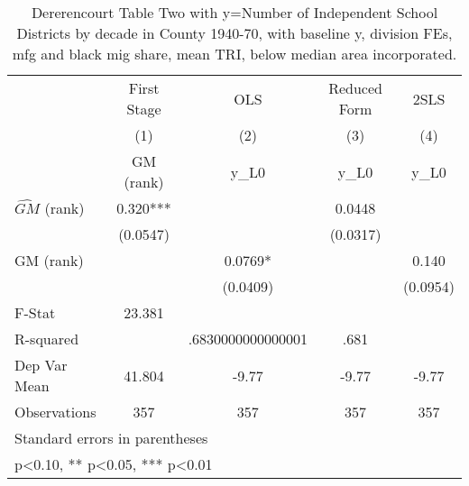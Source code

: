 \begin{table}[htbp]\centering
\def\sym#1{\ifmmode^{#1}\else\(^{#1}\)\fi}
\caption{Dererencourt Table Two with y=Number of Independent School Districts by decade in County 1940-70, with baseline y, division FEs, mfg and black mig share, mean TRI, below median area incorporated.}
\begin{tabular}{l*{4}{c}}
\toprule
                    & First Stage   &         OLS   &Reduced Form   &        2SLS   \\
                    &\multicolumn{1}{c}{(1)}&\multicolumn{1}{c}{(2)}&\multicolumn{1}{c}{(3)}&\multicolumn{1}{c}{(4)}\\
                    &\multicolumn{1}{c}{GM  (rank)}&\multicolumn{1}{c}{y\_L0}&\multicolumn{1}{c}{y\_L0}&\multicolumn{1}{c}{y\_L0}\\
\midrule
$\hat{GM}$ (rank)   &       0.320***&               &      0.0448   &               \\
                    &    (0.0547)   &               &    (0.0317)   &               \\
\addlinespace
GM  (rank)          &               &      0.0769*  &               &       0.140   \\
                    &               &    (0.0409)   &               &    (0.0954)   \\
\midrule
F-Stat              &      23.381   &               &               &               \\
R-squared           &               &.6830000000000001   &        .681   &               \\
Dep Var Mean        &      41.804   &       -9.77   &       -9.77   &       -9.77   \\
Observations        &         357   &         357   &         357   &         357   \\
\bottomrule
\multicolumn{5}{l}{\footnotesize Standard errors in parentheses}\\
\multicolumn{5}{l}{\footnotesize * p<0.10, ** p<0.05, *** p<0.01}\\
\end{tabular}
\end{table}
